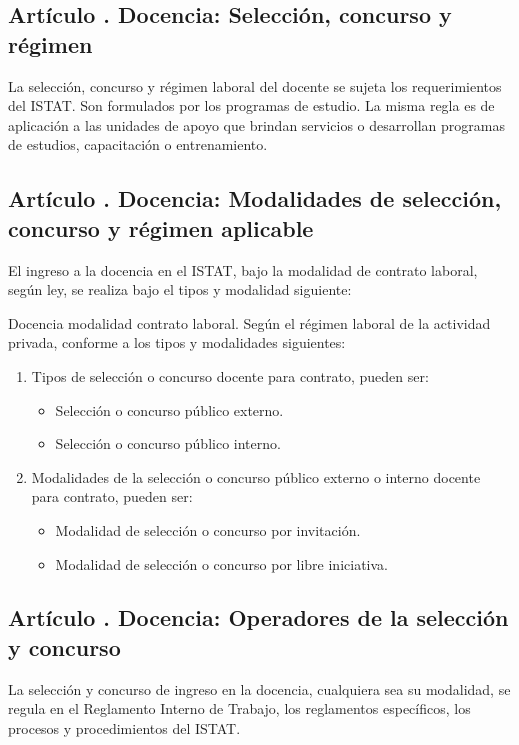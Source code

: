 \subsection{Artículo . Docencia: Selección, concurso y régimen}
\addtocounter{ns}{1}
La selección, concurso y régimen laboral del docente se sujeta los requerimientos del ISTAT. Son formulados por los programas de estudio. La misma regla es de aplicación a las unidades de apoyo que brindan servicios o desarrollan programas de estudios, capacitación o entrenamiento. 
\subsection{Artículo . Docencia: Modalidades de selección, concurso y régimen aplicable}
\addtocounter{ns}{1}
El ingreso a la docencia en el ISTAT, bajo la modalidad de contrato laboral, según ley, se realiza bajo el tipos y modalidad siguiente: 

Docencia modalidad contrato laboral. Según el régimen laboral de la actividad privada, conforme a los tipos y modalidades siguientes: 
\begin{enumerate}
\item Tipos de selección o concurso docente para contrato, pueden ser: 
\begin{itemize}
\item Selección o concurso público externo.  
\item Selección o concurso público interno. 
\end{itemize}

\item Modalidades de la selección o concurso público externo o interno docente para contrato, pueden ser: 
\begin{itemize}
\item Modalidad de selección o concurso por invitación. 
\item Modalidad de selección o concurso por libre iniciativa. 
\end{itemize} 
\end{enumerate}
\subsection{Artículo . Docencia: Operadores de la selección y concurso}
\addtocounter{ns}{1}
La selección y concurso de ingreso en la docencia, cualquiera sea su modalidad, se regula en el Reglamento Interno de Trabajo, los reglamentos específicos, los procesos y procedimientos del ISTAT. 
